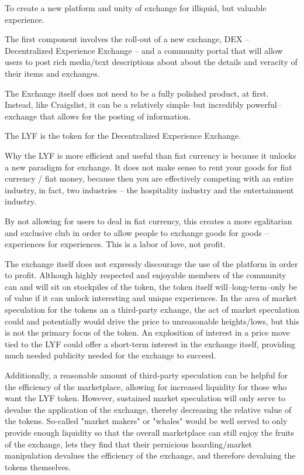 \documentclass[11pt]{article}
\begin{document}
To create a new platform and unity of exchange for illiquid, but valuable experience.

The first component involves the roll-out of a new exchange, DEX -- Decentralized Experience Exchange -- and a community portal that will allow users to post rich media/text descriptions about about the details and veracity of their items and exchanges.

The Exchange itself does not need to be a fully polished product, at first. Instead, like Craigslist, it can be a relatively simple--but incredibly powerful--exchange that allows for the posting of information. 

The LYF is the token for the Decentralized Experience Exchange. 

Why the LYF is more efficient and useful than fiat currency is because it unlocks a new paradigm for exchange. It does not make sense to rent your goods for fiat currency / fiat money, because then you are effectively competing with an entire industry, in fact, two industries -- the hospitality industry and the entertainment industry.

By not allowing for users to deal in fiat currency, this creates a more egalitarian and exclusive club in order to allow people to exchange goods for goods -- experiences for experiences. This is a labor of love, not profit.

The exchange itself does not expressly discourage the use of the platform in order to profit. Although highly respected and enjoyable members of the community can and will sit on stockpiles of the token, the token itself will--long-term--only be of value if it can unlock interesting and unique experiences. In the area of market speculation for the tokens an a third-party exhange, the act of market speculation could and potentially would drive the price to unreasonable heights/lows, but this is not the primary focus of the token. An explosition of interest in a price move tied to the LYF could offer a short-term interest in the exchange itself, providing much needed publicity needed for the exchange to succeed.

Additionally, a reasonable amount of third-party speculation can be helpful for the efficiency of the marketplace, allowing for increased liquidity for those who want the LYF token. However, sustained market speculation will only serve to devalue the application of the exchange, thereby decreasing the relative value of the tokens. So-called "market makers" or "whales" would be well served to only provide enough liquidity so that the overall marketplace can still enjoy the fruits of the exchange, lets they find that their pernicious hoarding/market manipulation devalues the efficiency of the exchange, and therefore devaluing the tokens themselves.
\end{document}
